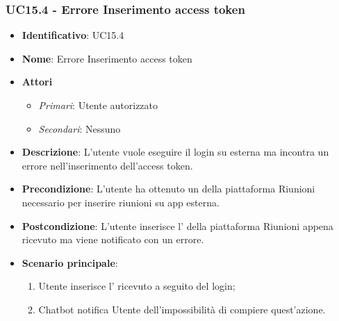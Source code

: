 \subsubsection{UC15.4 - Errore Inserimento access token }
\begin{itemize}
	\item \textbf{Identificativo}: UC15.4
	\item \textbf{Nome}: Errore Inserimento access token
	\item \textbf{Attori}
	\begin{itemize} 
		\item \textit{Primari}: Utente autorizzato
		\item \textit{Secondari}: Nessuno
	\end{itemize}
	\item \textbf{Descrizione}: L'utente vuole eseguire il login su  esterna ma incontra un errore nell'inserimento dell'access token.
	\item \textbf{Precondizione}: L'utente ha ottenuto un  della piattaforma Riunioni necessario per inserire riunioni su app esterna.
	\item \textbf{Postcondizione}: L'utente inserisce l' della piattaforma Riunioni appena ricevuto ma viene notificato con un errore.
	\item \textbf{Scenario principale}: \begin{enumerate}
		\item Utente inserisce l' ricevuto a seguito del login; 
		\item Chatbot notifica Utente dell'impossibilità di compiere quest'azione.
	\end{enumerate}
\end{itemize}